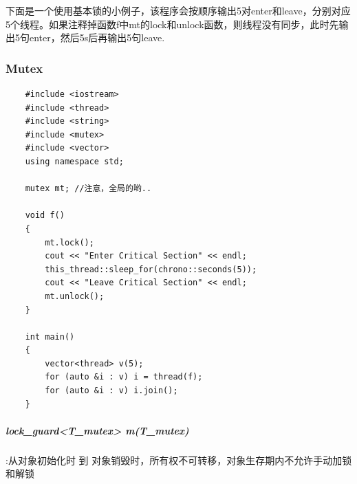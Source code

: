 \documentclass[UTF8,a4paper,12pt]{ctexbook}
\begin{document}
		下面是一个使用基本锁的小例子，该程序会按顺序输出5对enter和leave，分别对应5个线程。如果注释掉函数f中mt的lock和unlock函数，则线程没有同步，此时先输出5句enter，然后5s后再输出5句leave.
		\subsubsection{Mutex}
			\begin{lstlisting}
	#include <iostream>
	#include <thread>
	#include <string>
	#include <mutex>
	#include <vector>
	using namespace std;
	
	mutex mt; //注意，全局的哟..
	
	void f()
	{
		mt.lock();
		cout << "Enter Critical Section" << endl;
		this_thread::sleep_for(chrono::seconds(5));
		cout << "Leave Critical Section" << endl;
		mt.unlock();
	}
	
	int main()
	{
		vector<thread> v(5);
		for (auto &i : v) i = thread(f);
		for (auto &i : v) i.join();
	}
		\end{lstlisting}
		\subparagraph{lock\_guard<T\_mutex> m(T\_mutex)}:从对象初始化时 到 对象销毁时，所有权不可转移，对象生存期内不允许手动加锁和解锁
		
\end{document}

